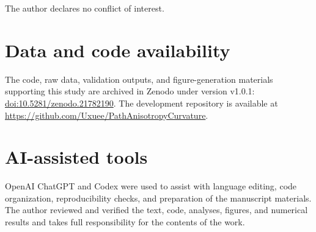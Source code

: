 \documentclass[11pt]{article}
\begin{document}
The author declares no conflict of interest.

\section*{Data and code availability}

The code, raw data, validation outputs, and figure-generation materials
supporting this study are archived in Zenodo under version v1.0.1:
\href{https://doi.org/10.5281/zenodo.21782190}{doi:10.5281/zenodo.21782190}.
The development repository is available at
\url{https://github.com/Uxuee/PathAnisotropyCurvature}.

\section*{AI-assisted tools}

OpenAI ChatGPT and Codex were used to assist with language editing, code
organization, reproducibility checks, and preparation of the manuscript
materials. The author reviewed and verified the text, code, analyses, figures,
and numerical results and takes full responsibility for the contents of the
work.
\end{document}
